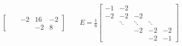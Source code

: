 \documentclass[11pt, titlepage]{article}
\begin{document}
\begin{enumerate}
\begin{enumerate}
\begin{align*}
\begin{bmatrix}
               &        & -2     & 16     & -2 \\
               &        &        & -2     &  8
          \end{bmatrix} \qquad
          E =
          \frac{1}{6}
          \begin{bmatrix}
            -1 & -2     &        &        &    \\
            -2 & -2     & -2     &        &    \\
               & \ddots & \ddots & \ddots &    \\
               &        & -2     & -2     & -2 \\
               &        &        & -2     & -1
          \end{bmatrix}
        \end{align*}


\end{enumerate}
\end{enumerate}
\end{document}
